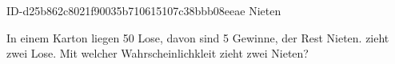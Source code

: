 \begin{exercise}
      {ID-d25b862c8021f90035b710615107c38bbb08eeae}
      {Nieten}
  \ifproblem\problem\par
    In einem Karton liegen 50 Lose, davon sind 5 Gewinne, der Rest Nieten.
    \xxa{} zieht zwei Lose. Mit welcher Wahrscheinlichkleit zieht \xxa{}
    zwei Nieten?
  \fi
\end{exercise}
